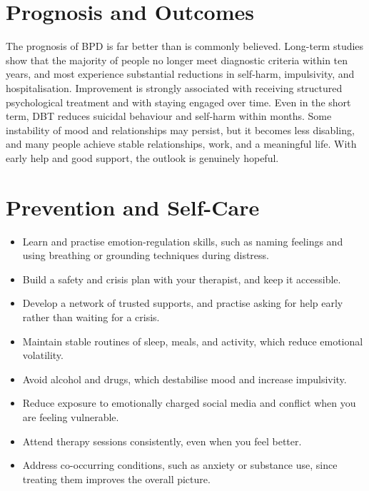 \section*{Prognosis and Outcomes}
The prognosis of BPD is far better than is commonly believed. Long-term studies show that the majority of people no longer meet diagnostic criteria within ten years, and most experience substantial reductions in self-harm, impulsivity, and hospitalisation. Improvement is strongly associated with receiving structured psychological treatment and with staying engaged over time. Even in the short term, DBT reduces suicidal behaviour and self-harm within months. Some instability of mood and relationships may persist, but it becomes less disabling, and many people achieve stable relationships, work, and a meaningful life. With early help and good support, the outlook is genuinely hopeful.

\section*{Prevention and Self-Care}
\begin{itemize}
    \item Learn and practise emotion-regulation skills, such as naming feelings and using breathing or grounding techniques during distress.
    \item Build a safety and crisis plan with your therapist, and keep it accessible.
    \item Develop a network of trusted supports, and practise asking for help early rather than waiting for a crisis.
    \item Maintain stable routines of sleep, meals, and activity, which reduce emotional volatility.
    \item Avoid alcohol and drugs, which destabilise mood and increase impulsivity.
    \item Reduce exposure to emotionally charged social media and conflict when you are feeling vulnerable.
    \item Attend therapy sessions consistently, even when you feel better.
    \item Address co-occurring conditions, such as anxiety or substance use, since treating them improves the overall picture.
\end{itemize}

